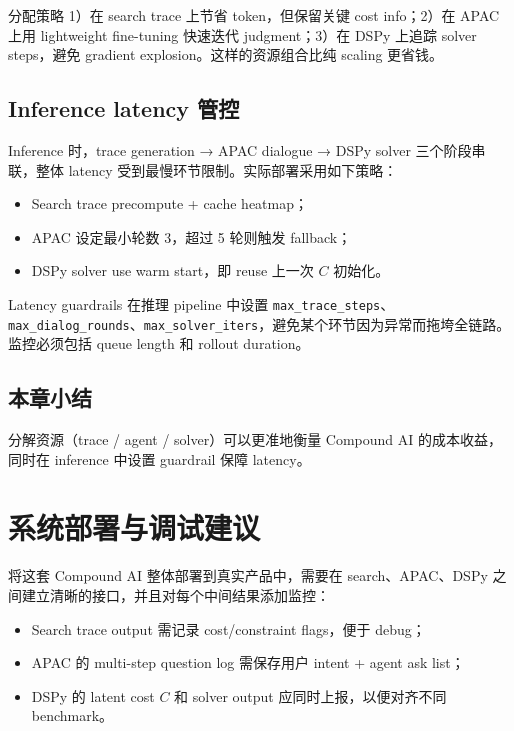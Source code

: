 \documentclass[a4paper]{article}
\begin{document}
\begin{importantbox}{分配策略}
1）在 search trace 上节省 token，但保留关键 cost info；2）在 APAC 上用 lightweight fine-tuning 快速迭代 judgment；3）在 DSPy 上追踪 solver steps，避免 gradient explosion。这样的资源组合比纯 scaling 更省钱。
\end{importantbox}

\subsection{Inference latency 管控}

Inference 时，trace generation → APAC dialogue → DSPy solver 三个阶段串联，整体 latency 受到最慢环节限制。实际部署采用如下策略：
\begin{itemize}
    \item Search trace precompute + cache heatmap；
    \item APAC 设定最小轮数 3，超过 5 轮则触发 fallback；
    \item DSPy solver use warm start，即 reuse 上一次 \(C\) 初始化。
\end{itemize}

\begin{knowledgebox}{Latency guardrails}
在推理 pipeline 中设置 \texttt{max\_trace\_steps}、\texttt{max\_dialog\_rounds}、\texttt{max\_solver\_iters}，避免某个环节因为异常而拖垮全链路。监控必须包括 queue length 和 rollout duration。
\end{knowledgebox}

\subsection{本章小结}

分解资源（trace / agent / solver）可以更准地衡量 Compound AI 的成本收益，同时在 inference 中设置 guardrail 保障 latency。

\section{系统部署与调试建议}

将这套 Compound AI 整体部署到真实产品中，需要在 search、APAC、DSPy 之间建立清晰的接口，并且对每个中间结果添加监控：
\begin{itemize}
    \item Search trace output 需记录 cost/constraint flags，便于 debug；
    \item APAC 的 multi-step question log 需保存用户 intent + agent ask list；
    \item DSPy 的 latent cost \(C\) 和 solver output 应同时上报，以便对齐不同 benchmark。
\end{itemize}
\end{document}

